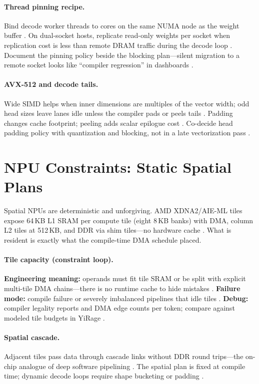 \paragraph{Thread pinning recipe.}
Bind decode worker threads to cores on the same NUMA node as the weight buffer \citep{patel2025llminference}.
On dual-socket hosts, replicate read-only weights per socket when replication cost is less than remote DRAM traffic during the decode loop \citep{memoryfloor2026}.
Document the pinning policy beside the blocking plan---silent migration to a remote socket looks like ``compiler regression'' in dashboards \citep{yirage2026}.

\paragraph{AVX-512 and decode tails.}
Wide SIMD helps when inner dimensions are multiples of the vector width; odd head sizes leave lanes idle unless the compiler pads or peels tails \citep{dlbook}.
Padding changes cache footprint; peeling adds scalar epilogue cost \citep{rotem2018glow}.
Co-decide head padding policy with quantization and blocking, not in a late vectorization pass \citep{chen2020compilerbasedhardw}.

\section{NPU Constraints: Static Spatial Plans}
\label{sec:npu_constraints}

Spatial NPUs are deterministic and unforgiving.
AMD XDNA2/AIE-ML tiles expose 64\,KB L1 SRAM per compute tile (eight 8\,KB banks) with DMA, column L2 tiles at 512\,KB, and DDR via shim tiles---no hardware cache \citep{amd2024xdna,amd2024aie}.
What is resident is exactly what the compile-time DMA schedule placed.

\paragraph{Tile capacity (constraint loop).}
\textbf{Engineering meaning:} operands must fit tile SRAM or be split with explicit multi-tile DMA chains---there is no runtime cache to hide mistakes \citep{amd2024xdna}.
\textbf{Failure mode:} compile failure or severely imbalanced pipelines that idle tiles \citep{wu2024mirage}.
\textbf{Debug:} compiler legality reports and DMA edge counts per token; compare against modeled tile budgets in YiRage \citep{yirage2026}.

\paragraph{Spatial cascade.}
Adjacent tiles pass data through cascade links without DDR round trips---the on-chip analogue of deep software pipelining \citep{amd2024aie}.
The spatial plan is fixed at compile time; dynamic decode loops require shape bucketing or padding \citep{lai2023relax,amd2024xdna}.

